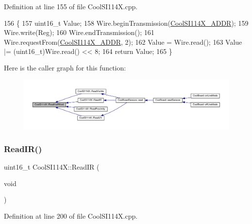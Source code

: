 Definition at line 155 of file Cool\+S\+I114\+X.\+cpp.


\begin{DoxyCode}
156 \{
157   uint16\_t Value;
158   Wire.beginTransmission(\hyperlink{_cool_s_i114_x_8h_a1d1122c2b489dc4718053dd79f9760fe}{CoolSI114X\_ADDR});
159   Wire.write(Reg); 
160   Wire.endTransmission(); 
161   Wire.requestFrom(\hyperlink{_cool_s_i114_x_8h_a1d1122c2b489dc4718053dd79f9760fe}{CoolSI114X\_ADDR}, 2);
162   Value = Wire.read();
163   Value |= (uint16\_t)Wire.read() << 8; 
164   \textcolor{keywordflow}{return} Value;
165 \}
\end{DoxyCode}
Here is the caller graph for this function\+:\nopagebreak
\begin{figure}[H]
\begin{center}
\leavevmode
\includegraphics[width=350pt]{dd/d67/class_cool_s_i114_x_a1d25c9e137874af529804c2ec796a6b9_icgraph}
\end{center}
\end{figure}
\mbox{\label{class_cool_s_i114_x_abc536ee7ae8e3ba9d1069acc3889a2cf}} 
\subsubsection{\texorpdfstring{Read\+I\+R()}{ReadIR()}}
{\footnotesize\ttfamily uint16\+\_\+t Cool\+S\+I114\+X\+::\+Read\+IR (\begin{DoxyParamCaption}\item[{void}]{ }\end{DoxyParamCaption})}



Definition at line 200 of file Cool\+S\+I114\+X.\+cpp.



